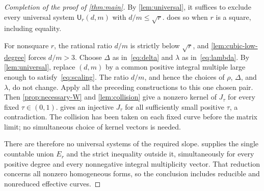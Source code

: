 \begin{proof}[Completion of the proof of \cref{thm:main}]
By \cref{lem:universal}, it suffices to exclude every universal system $\mathsf U_r(d,m)$ with $d/m\le\sqrt r$.  does so when $r$ is a square, including equality.

For nonsquare $r$, the rational ratio $d/m$ is strictly below $\sqrt r$, and \cref{lem:cubic-low-degree} forces $d/m>3$. Choose $\Delta$ as in~\eqref{eq:delta} and $\lambda$ as in~\eqref{eq:lambda}. By \cref{lem:universal}, replace $(d,m)$ by a common positive integral multiple large enough to satisfy~\eqref{eq:scaling}. The ratio $d/m$, and hence the choices of $\rho$, $\Delta$, and $\lambda$, do not change. Apply all the preceding constructions to this one chosen pair. Then \cref{prop:necessary-W} and \cref{lem:collision} give a nonzero kernel of $J_\tau$ for every fixed $\tau\in(0,1)$.  gives an injective $J_\tau$ for all sufficiently small positive $\tau$, a contradiction. The collision has been taken on each fixed curve before the matrix limit; no simultaneous choice of kernel vectors is needed.

There are therefore no universal systems of the required slope.  supplies the single countable union $E_r$ and the strict inequality outside it, simultaneously for every positive degree and every nonnegative integral multiplicity vector. That reduction concerns all nonzero homogeneous forms, so the conclusion includes reducible and nonreduced effective curves.
\end{proof}
